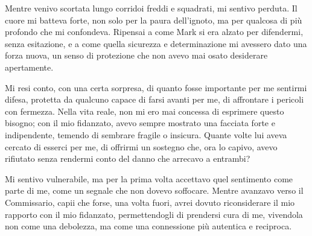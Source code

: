 Mentre venivo scortata lungo corridoi freddi e squadrati, mi sentivo perduta. Il cuore mi batteva forte, non solo per la paura dell'ignoto, ma per qualcosa di più profondo che mi confondeva. Ripensai a come Mark si era alzato per difendermi, senza esitazione, e a come quella sicurezza e determinazione mi avessero dato una forza nuova, un senso di protezione che non avevo mai osato desiderare apertamente.

Mi resi conto, con una certa sorpresa, di quanto fosse importante per me sentirmi difesa, protetta da qualcuno capace di farsi avanti per me, di affrontare i pericoli con fermezza. Nella vita reale, non mi ero mai concessa di esprimere questo bisogno; con il mio fidanzato, avevo sempre mostrato una facciata forte e indipendente, temendo di sembrare fragile o insicura. Quante volte lui aveva cercato di esserci per me, di offrirmi un sostegno che, ora lo capivo, avevo rifiutato senza rendermi conto del danno che arrecavo a entrambi?

Mi sentivo vulnerabile, ma per la prima volta accettavo quel sentimento come parte di me, come un segnale che non dovevo soffocare. Mentre avanzavo verso il Commissario, capii che forse, una volta fuori, avrei dovuto riconsiderare il mio rapporto con il mio fidanzato, permettendogli di prendersi cura di me, vivendola non come una debolezza, ma come una connessione più autentica e reciproca.
